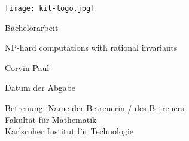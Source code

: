 \documentclass[12pt,a4paper]{scrartcl}
\numberwithin{equation}{section}
\begin{document}
  \pagestyle{empty}

  \begin{titlepage}

    \texttt{[image: kit-logo.jpg]} 
    \vspace*{2cm} 

 \begin{center} \large 
    
    Bachelorarbeit
    \vspace*{2cm}

    {\huge NP-hard computations with rational invariants}
    \vspace*{2.5cm}

    Corvin Paul
    \vspace*{1.5cm}

    Datum der Abgabe
    \vspace*{4.5cm}


    Betreuung: Name der Betreuerin / des Betreuers \\[1cm]
    Fakultät für Mathematik \\[1cm]
		Karlsruher Institut für Technologie
  \end{center}
\end{titlepage}



  \tableofcontents

\newpage
 


  \pagestyle{headings}


 \newpage  %







  \newpage
  
  
{}

 
      

\newpage
  
 \thispagestyle{empty}


\vspace*{8cm}
\end{document}
